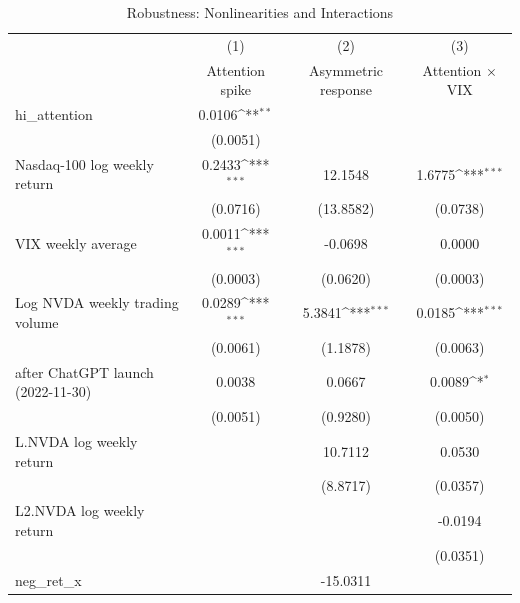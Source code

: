 \begin{table}[htbp]\centering
\def\sym#1{\ifmmode^{#1}\else\(^{#1}\)\fi}
\caption{Robustness: Nonlinearities and Interactions}
\begin{tabular}{l*{3}{c}}
\toprule
                    &\multicolumn{1}{c}{(1)}&\multicolumn{1}{c}{(2)}&\multicolumn{1}{c}{(3)}\\
                    &\multicolumn{1}{c}{Attention spike}&\multicolumn{1}{c}{Asymmetric response}&\multicolumn{1}{c}{Attention × VIX}\\
\midrule
hi\_attention        &      0.0106\sym{**} &                     &                     \\
                    &    (0.0051)         &                     &                     \\
\addlinespace
Nasdaq-100 log weekly return&      0.2433\sym{***}&     12.1548         &      1.6775\sym{***}\\
                    &    (0.0716)         &   (13.8582)         &    (0.0738)         \\
\addlinespace
VIX weekly average  &      0.0011\sym{***}&     -0.0698         &      0.0000         \\
                    &    (0.0003)         &    (0.0620)         &    (0.0003)         \\
\addlinespace
Log NVDA weekly trading volume&      0.0289\sym{***}&      5.3841\sym{***}&      0.0185\sym{***}\\
                    &    (0.0061)         &    (1.1878)         &    (0.0063)         \\
\addlinespace
=1 after ChatGPT launch (2022-11-30)&      0.0038         &      0.0667         &      0.0089\sym{*}  \\
                    &    (0.0051)         &    (0.9280)         &    (0.0050)         \\
\addlinespace
L.NVDA log weekly return&                     &     10.7112         &      0.0530         \\
                    &                     &    (8.8717)         &    (0.0357)         \\
\addlinespace
L2.NVDA log weekly return&                     &                     &     -0.0194         \\
                    &                     &                     &    (0.0351)         \\
\addlinespace
neg\_ret\_x           &                     &    -15.0311         &                     \\

\end{tabular}
\end{table}
